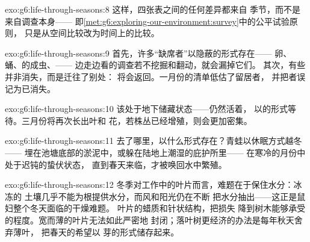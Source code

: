 \begin{solution}{exo:g6:life-through-seasons:8}
这样，四张表之间的任何差异都来自
季节，而不是来自调查本身——
即\cref{met:g6:exploring-our-environment:survey}中的公平试验原则，
只是从空间比较改为时间上的比较。
\end{solution}

\begin{solution}{exo:g6:life-through-seasons:9}
首先，许多“缺席者”以隐蔽的形式存在——
卵、蛹、的成虫、——
边走边看的调查若不挖掘和翻动，就会漏掉它们。
其次，有些并非消失，而是迁往了别处：
将会返回。一月份的清单低估了留居者，
并把者误记为已消失。
\end{solution}

\begin{solution}{exo:g6:life-through-seasons:10}
该处于地下储藏状态——仍然活着，
以的形式等待。三月份将再次长出叶和
花，若株丛已经增殖，则会更加密集。
\end{solution}

\begin{solution}{exo:g6:life-through-seasons:11}
去了哪里，以什么形式存在？青蛙以休眠方式越冬——
埋在池塘底部的淤泥中，或躲在陆地上潮湿的庇护所里——
在寒冷的月份中处于迟钝的蛰伏状态，
直到春天来临，才被唤回水中繁殖。
\end{solution}

\begin{solution}{exo:g6:life-through-seasons:12}
冬季对工作中的叶片而言，难题在于保住水分：冰冻的
土壤几乎不能为根提供水分，而风和阳光仍在不断
把水分抽出——这正是鼠妇整个冬天面临的干燥难题。
叶片的蜡质和针状结构，把损失
降到树木能够承受的程度。宽而薄的叶片无法如此严密地
封闭；落叶树更经济的办法是每年秋天舍弃薄叶，
把春天的希望以
芽的形式储存起来。
\end{solution}

